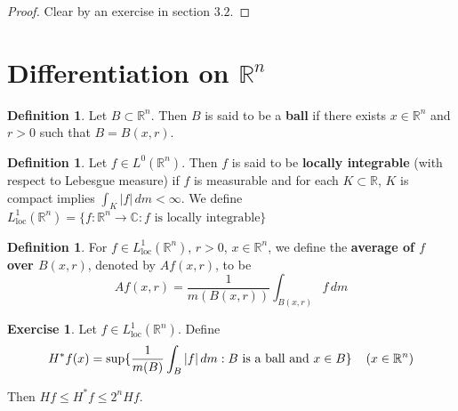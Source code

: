 \documentclass{book}
\theoremstyle{definition}
\newtheorem{defn}[definition]{Definition}
\newtheorem{ex}[definition]{Exercise}
\newcommand{\C}{\mathbb{C}}
\newcommand{\R}{\mathbb{R}}
\newcommand{\lex}[1]{\label{ex:#1}}
\newcommand{\ld}[1]{\label{defn:#1}}
\DeclareMathOperator*{\0}{\mbf{0}}
\DeclareMathOperator*{\1}{\mbf{1}}
\newcommand{\dm}{\, d m}
\newcommand{\Ll}{L^1_{\text{loc}}(\R^n)}
\begin{document}
	\begin{proof}
	Clear by an exercise in section $3.2$.
	\end{proof}
	
	
	
	
	
	
	
	
	
	
	
	
	
	
	
	
	
	
	
	
	
	
	
	
	
	
	
	
	

	
	
	
	
	
	
	
	
	\newpage
	\section{Differentiation on $\R^n$}
	
	\begin{defn} \ld{00000} 
		Let $B \subset \R^n$. Then $B$ is said to be a \textbf{ball} if there exists $x \in \R^n$ and $r > 0$ such that $B = B(x, r)$. 
	\end{defn}
	
	\begin{defn} \ld{00000} 
		Let $f \in L^0(\R^n)$. Then $f$ is said to be \textbf{locally integrable} (with respect to Lebesgue measure) if $f$ is measurable and for each $K \subset \R$, $K$ is compact implies $\int_K |f| \dm < \infty$. We define $L^1_{\text{loc}}(\R^n) = \{f:\R^n \rightarrow \C: f \text{ is locally integrable}\}$
	\end{defn}
	
	\begin{defn} \ld{00000} 
		For $f \in \Ll$, $r>0$, $x \in \R^n$, we define the \textbf{average of $f$ over $B(x,r)$}, denoted by $Af(x,r)$, to be $$Af(x,r) = \frac{1}{m(B(x,r))}\int_{B(x,r)}f\dm$$
	\end{defn}
	
	\begin{ex} \lex{00000} 
		Let $f \in \Ll$. Define $$H^*f(x) = \sup\{\frac{1}{m(B)}\int_{B}|f|\dm: B \text{ is a ball and } x \in B\} \hspace{4mm} (x \in \R^n)$$
		
		Then $Hf \leq H^*f \leq 2^n Hf$. 
	\end{ex}
	
\end{document}
